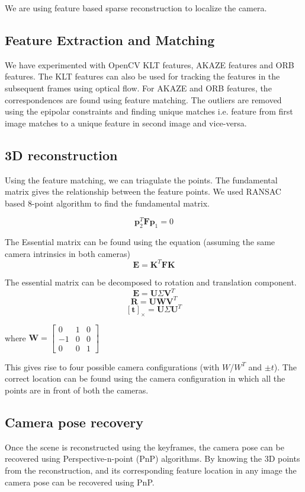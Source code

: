 \documentclass[12pt,twocolumn,letterpaper]{article}
\begin{document}
We are using feature based sparse reconstruction to localize the camera. 

\subsection{Feature Extraction and Matching}
We have experimented with OpenCV KLT features, AKAZE features and ORB features. The KLT features can also be used for tracking the features in the subsequent frames using optical flow. For AKAZE\cite{akaze} and ORB features, the correspondences are found using feature matching. The outliers are removed using the epipolar constraints and finding unique matches i.e. feature from first image matches to a unique feature in second image and vice-versa.

\subsection{3D reconstruction}
Using the feature matching, we can triagulate the points. The fundamental matrix gives the relationship between the feature points. We used RANSAC based 8-point algorithm to find the fundamental matrix.

$$ \textbf{p}_2^T \textbf{Fp}_1 = 0 $$

The Essential matrix can be found using the equation (assuming the same camera intrinsics in both cameras)
$$ \textbf{E} = \textbf{K}^T \textbf{F} \textbf{K} $$

The essential matrix can be decomposed to rotation and translation component.
$$ \textbf{E} = \textbf{U}\Sigma \textbf{V}^T $$
$$ \textbf{R} = \textbf{U} \textbf{W} \textbf{V}^T $$
$$ [\textbf{t}]_\times = \textbf{U} \Sigma \textbf{U}^T $$

where $\textbf{W} = \begin{bmatrix}
0 & 1 & 0\\
-1 & 0 & 0\\
0& 0 & 1
\end{bmatrix} $

This gives rise to four possible camera configurations (with $W$/$W^T$ and $\pm t$). The correct location can be found using the camera configuration in which all the points are in front of both the cameras.

\subsection{Camera pose recovery}
Once the scene is reconstructed using the keyframes, the camera pose can be recovered using Perspective-n-point (PnP) algorithms. By knowing the 3D points from the reconstruction, and its corresponding feature location in any image the camera pose can be recovered using PnP.
\end{document}
